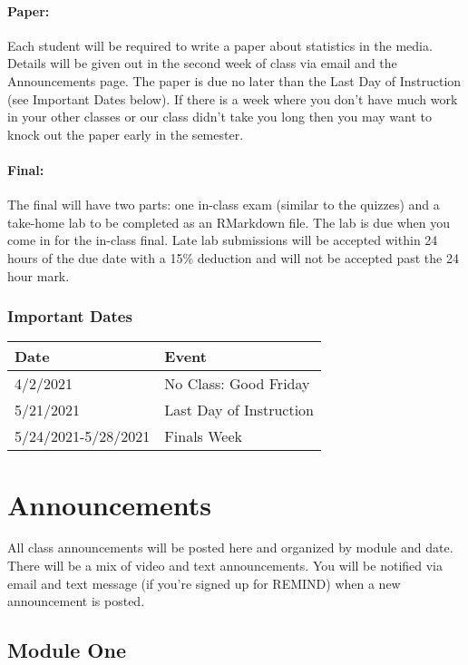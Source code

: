 \documentclass[
]{book}
\begin{document}
\hypertarget{paper}{%
\subsubsection{Paper:}\label{paper}}

Each student will be required to write a paper about statistics in the media. Details will be given out in the second week of class via email and the Announcements page. The paper is due no later than the Last Day of Instruction (see Important Dates below). If there is a week where you don't have much work in your other classes or our class didn't take you long then you may want to knock out the paper early in the semester.

\hypertarget{final}{%
\subsubsection{Final:}\label{final}}

The final will have two parts: one in-class exam (similar to the quizzes) and a take-home lab to be completed as an RMarkdown file. The lab is due when you come in for the in-class final. Late lab submissions will be accepted within 24 hours of the due date with a 15\% deduction and will not be accepted past the 24 hour mark.

\hypertarget{important-dates}{%
\subsection{Important Dates}\label{important-dates}}

\begin{longtable}[]{@{}ll@{}}
\toprule
Date & Event\tabularnewline
\midrule
\endhead
4/2/2021 & No Class: Good Friday\tabularnewline
5/21/2021 & Last Day of Instruction\tabularnewline
5/24/2021-5/28/2021 & Finals Week\tabularnewline
\bottomrule
\end{longtable}

\hypertarget{announcements}{%
\chapter{Announcements}\label{announcements}}

All class announcements will be posted here and organized by module and date. There will be a mix of video and text announcements. You will be notified via email and text message (if you're signed up for REMIND) when a new announcement is posted.

\hypertarget{module-one}{%
\section{Module One}\label{module-one}}
\end{document}
